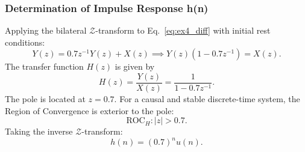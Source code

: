 \documentclass[12pt,a4paper]{article}
\begin{document}
\subsubsection{Determination of Impulse Response h(n)}
Applying the bilateral $\mathcal{Z}$-transform to Eq.~\eqref{eq:ex4_diff} with initial rest conditions:
\begin{equation}
    Y(z) = 0.7 z^{-1} Y(z) + X(z) \implies Y(z)(1 - 0.7 z^{-1}) = X(z).
\end{equation}
The transfer function $H(z)$ is given by
\begin{equation}
    H(z) = \frac{Y(z)}{X(z)} = \frac{1}{1 - 0.7 z^{-1}}.
\end{equation}
The pole is located at $z = 0.7$. For a causal and stable discrete-time system, the Region of Convergence is exterior to the pole:
\begin{equation}
    \text{ROC}_H: |z| > 0.7.
\end{equation}
Taking the inverse $\mathcal{Z}$-transform:
\begin{equation}
    h(n) = (0.7)^n u(n).
\end{equation}
\end{document}
